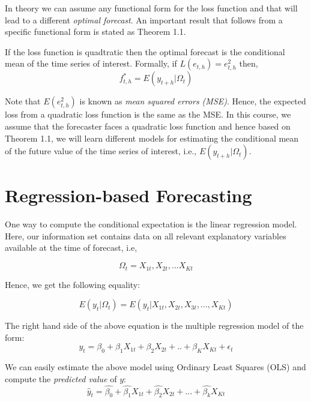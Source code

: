 \documentclass[]{book}
\theoremstyle{definition}
\theoremstyle{definition}
\theoremstyle{definition}
\theoremstyle{remark}
\let\BeginKnitrBlock\begin \let\EndKnitrBlock\end
\begin{document}
In theory we can assume any functional form for the loss function and that will lead to a different \emph{optimal forecast}. An important result that follows from a specific functional form is stated as Theorem 1.1.

\BeginKnitrBlock{theorem}
\protect\hypertarget{thm:unnamed-chunk-2}{}{\label{thm:unnamed-chunk-2} }If the loss function is quadtratic then the optimal forecast is the conditional mean of the time series of interest. Formally, if \(L(e_{t,h})=e_{t,h}^2\) then,
\begin{equation}
f^*_{t,h}=E(y_{t+h}|\Omega_t)
\end{equation}
\EndKnitrBlock{theorem}

Note that \(E(e_{t,h}^2)\) is known as \emph{mean squared errors (MSE)}. Hence, the expected loss from a quadratic loss function is the same as the MSE. In this course, we assume that the forecaster faces a quadratic loss function and hence based on Theorem 1.1, we will learn different models for estimating the conditional mean of the future value of the time series of interest, i.e., \(E(y_{t+h}|\Omega_t)\).

\hypertarget{regression-based-forecasting}{%
\chapter{Regression-based Forecasting}\label{regression-based-forecasting}}

One way to compute the conditional expectation is the linear regression model. Here, our information set contains data on all relevant explanatory variables available at the time of forecast, i.e,

\begin{equation}
\Omega_t={X_{1t}, X_{2t},...X_{Kt}}
\end{equation}

Hence, we get the following equality:

\begin{equation}
E(y_t|\Omega_t)=E(y_{t}|X_{1t}, X_{2t}, X_{3t},...,X_{Kt})
\end{equation}

The right hand side of the above equation is the multiple regression model of the form:
\begin{equation}
 y_{t}=\beta_0+\beta_1 X_{1t}+\beta_2 X_{2t}+..+\beta_K X_{Kt}+\epsilon_t
 \end{equation}

We can easily estimate the above model using Ordinary Least Squares (OLS) and compute the \emph{predicted value} of \(y\):
\begin{equation}
    \widehat{y}_t = \widehat{\beta_0} +\widehat{\beta_1} X_{1t} +\widehat{\beta_2} X_{2t}+...+ \widehat{\beta_k} X_{Kt}
  \end{equation}
\end{document}
